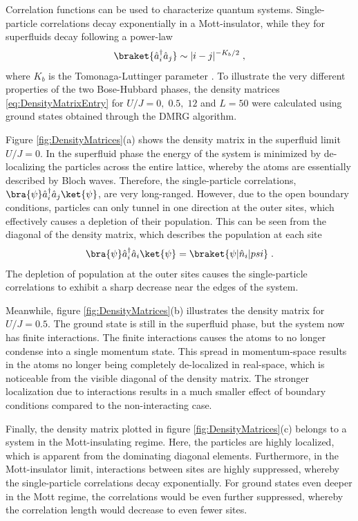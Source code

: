 Correlation functions can be used to characterize quantum systems. Single-particle correlations decay exponentially in a Mott-insulator, while they for superfluids decay following a power-law 
\begin{equation}
	\braket{\hat{a}_{i}^{\dag} \hat{a}_{j}} \sim |i - j|^{-K_b /2} \; ,
	\label{eq:superfluidCorrelation}
\end{equation}
where $K_b$ is the Tomonaga-Luttinger parameter \cite{characPhases}. To illustrate the very different properties of the two Bose-Hubbard phases, the density matrices \eqref{eq:DensityMatrixEntry} for $U/J = 0, \; 0.5, \; 12$ and $L = 50$ were calculated using ground states obtained through the DMRG algorithm. 

Figure \ref{fig:DensityMatrices}(a) shows the density matrix in the superfluid limit $U/J = 0$. In the superfluid phase the energy of the system is minimized by de-localizing the particles across the entire lattice, whereby the atoms are essentially described by Bloch waves. Therefore, the single-particle correlations, $\bra{\psi} \hat{a}_{i}^{\dag} \hat{a}_{j} \ket{\psi}$, are very long-ranged. However, due to the open boundary conditions, particles can only tunnel in one direction at the outer sites, which effectively causes a depletion of their population. This can be seen from the diagonal of the density matrix, which describes the population at each site
\begin{equation}
	\bra{\psi} \hat{a}_{i}^{\dag} \hat{a}_{i} \ket{\psi} = \braket{\psi | \hat{n}_i | psi} \; .
\end{equation}
The depletion of population at the outer sites causes the single-particle correlations to exhibit a sharp decrease near the edges of the system.

Meanwhile, figure \ref{fig:DensityMatrices}(b) illustrates the density matrix for $U/J = 0.5$. The ground state is still in the superfluid phase, but the system now has finite interactions. The finite interactions causes the atoms to no longer condense into a single momentum state. This spread in momentum-space results in the atoms no longer being completely de-localized in real-space, which is noticeable from the visible diagonal of the density matrix. The stronger localization due to interactions results in a much smaller effect of boundary conditions compared to the non-interacting case. 

Finally, the density matrix plotted in figure \ref{fig:DensityMatrices}(c) belongs to a system in the Mott-insulating regime. Here, the particles are highly localized, which is apparent from the dominating diagonal elements. Furthermore, in the Mott-insulator limit, interactions between sites are highly suppressed, whereby the single-particle correlations decay exponentially. For ground states even deeper in the Mott regime, the correlations would be even further suppressed, whereby the correlation length would decrease to even fewer sites. 

